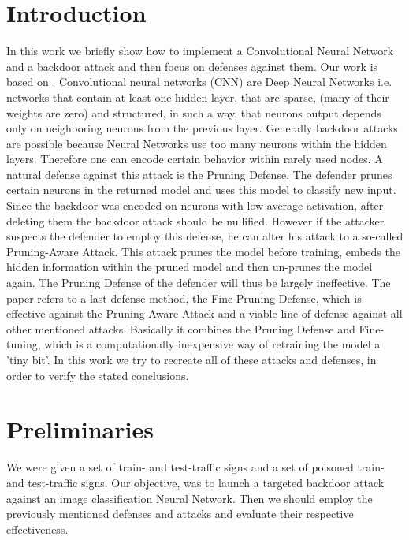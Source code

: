 \documentclass[a4paper,12pt]{report}
\begin{document}
\section{Introduction}
In this work we briefly show how to implement a Convolutional Neural Network and a backdoor attack and then focus on defenses against them. Our work is based on \citep{paper}.
Convolutional neural networks (CNN)\label{CNN} are Deep Neural Networks i.e. networks that contain at least one hidden layer, that are sparse, (many of
their weights are zero) and structured, in such a way, that neurons output depends only on neighboring neurons from the previous layer. Generally backdoor attacks are possible because Neural Networks use too many neurons within the hidden layers. Therefore one can encode certain behavior within rarely used nodes. A natural defense against this attack is the Pruning Defense. The defender prunes certain neurons in the returned model and uses this model to classify new input. Since the backdoor was encoded on neurons with low average activation, after deleting them the backdoor attack should be nullified. However if the attacker suspects the defender to employ this defense, he can alter his attack to a so-called Pruning-Aware Attack. This attack prunes the model before training, embeds the hidden information within the pruned model and then un-prunes the model again. The Pruning Defense of the defender will thus be largely ineffective. The paper refers to a last defense method, the Fine-Pruning Defense, which is effective against the Pruning-Aware Attack and a viable line of defense against all other mentioned attacks. Basically it combines the Pruning Defense and Fine-tuning, which is a computationally inexpensive way of retraining the model a 'tiny bit'. In this work we try to recreate all of these attacks and defenses, in order to verify the stated conclusions. 

\section{Preliminaries}
We were given a set of train- and test-traffic signs and a set of poisoned train- and test-traffic signs. Our objective, was to launch a targeted backdoor attack against an image classification Neural Network. Then we should employ the previously mentioned defenses and attacks and evaluate their respective effectiveness.
\end{document}
